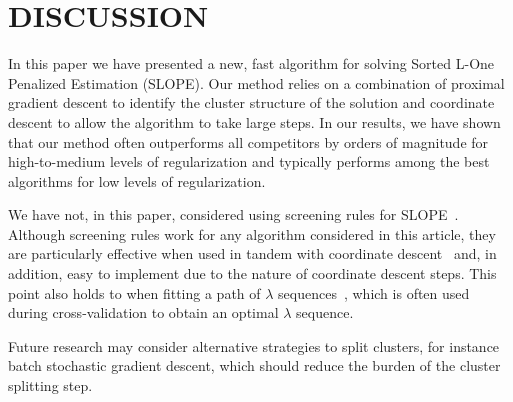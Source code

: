 \section{DISCUSSION}\label{sec:discussion}

In this paper we have presented a new, fast algorithm for solving Sorted L-One Penalized Estimation (SLOPE).
Our method relies on a combination of proximal gradient descent to identify the cluster structure of the solution and coordinate descent to allow the algorithm to take large steps.
In our results, we have shown that our method often outperforms all competitors by orders of magnitude for high-to-medium levels of regularization and typically performs among the best algorithms for low levels of regularization.

We have not, in this paper, considered using screening rules for SLOPE~\parencite{larsson2020c,elvira2022}.
Although screening rules work for any algorithm considered in this article, they are particularly effective when used in tandem with coordinate descent~\parencite{fercoq2015} and, in addition, easy to implement due to the nature of coordinate descent steps.
This point also holds to when fitting a path of \(\lambda\) sequences~\parencite{friedman2007,friedman2010}, which is often used during cross-validation to obtain an optimal \(\lambda\) sequence.

Future research may consider alternative strategies to split clusters, for instance batch stochastic gradient descent, which should reduce the burden of the cluster splitting step.
